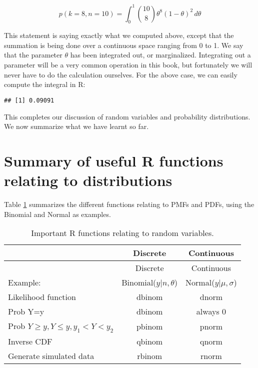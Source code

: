 \documentclass[12pt,]{krantz}
\newenvironment{Shaded}{\begin{snugshade}}{\end{snugshade}}
\newcommand{\ControlFlowTok}[1]{\textcolor[rgb]{0.13,0.29,0.53}{\textbf{#1}}}
\newcommand{\DataTypeTok}[1]{\textcolor[rgb]{0.13,0.29,0.53}{#1}}
\newcommand{\DecValTok}[1]{\textcolor[rgb]{0.00,0.00,0.81}{#1}}
\newcommand{\KeywordTok}[1]{\textcolor[rgb]{0.13,0.29,0.53}{\textbf{#1}}}
\newcommand{\NormalTok}[1]{#1}
\newcommand{\OperatorTok}[1]{\textcolor[rgb]{0.81,0.36,0.00}{\textbf{#1}}}
\newcommand{\StringTok}[1]{\textcolor[rgb]{0.31,0.60,0.02}{#1}}
\begin{document}
\begin{equation}
p(k=8,n=10) = \int_0^1 \binom{10}{8} \theta^8 (1-\theta)^{2}\, d\theta
\end{equation}

This statement is saying exactly what we computed above, except that the summation is being done over a continuous space ranging from 0 to 1. We say that the parameter \(\theta\) has been integrated out, or marginalized. Integrating out a parameter will be a very common operation in this book, but fortunately we will never have to do the calculation ourselves. For the above case, we can easily compute the integral in R:

\begin{Shaded}
\end{Shaded}

\begin{verbatim}
## [1] 0.09091
\end{verbatim}

This completes our discussion of random variables and probability distributions. We now summarize what we have learnt so far.

\hypertarget{summary-of-useful-r-functions-relating-to-distributions}{%
\section{Summary of useful R functions relating to distributions}\label{summary-of-useful-r-functions-relating-to-distributions}}

Table \ref{tab:dpqrfunctions} summarizes the different functions relating to PMFs and PDFs, using the Binomial and Normal as examples.

\begin{longtable}[]{@{}lcc@{}}
\caption{\label{tab:dpqrfunctions} Important R functions relating to random variables.}\tabularnewline
\toprule
& Discrete & Continuous\tabularnewline
\midrule
\endfirsthead
\toprule
& Discrete & Continuous\tabularnewline
\midrule
\endhead
Example: & Binomial(\(y|n,\theta\)) & Normal(\(y|\mu,\sigma\))\tabularnewline
Likelihood function & dbinom & dnorm\tabularnewline
Prob Y=y & dbinom & always 0\tabularnewline
Prob \(Y\geq y, Y\leq y, y_1<Y<y_2\) & pbinom & pnorm\tabularnewline
Inverse CDF & qbinom & qnorm\tabularnewline
Generate simulated data & rbinom & rnorm\tabularnewline
\bottomrule
\end{longtable}
\end{document}
